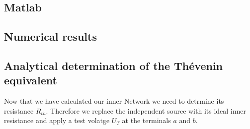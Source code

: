 \documentclass[a4paper]{article}
\begin{document}
\subsection{Matlab}
\subsection{Numerical results}
\newpage
\subsection{Analytical determination of the Thévenin equivalent}
Now that we have calculated our inner Network we need to detrmine its resistance $R_{th}$.
Therefore we replace the independent source with its ideal inner resistance and apply a test
volatge $U_T$ at the terminals $a$ and $b$.\\
\end{document}
